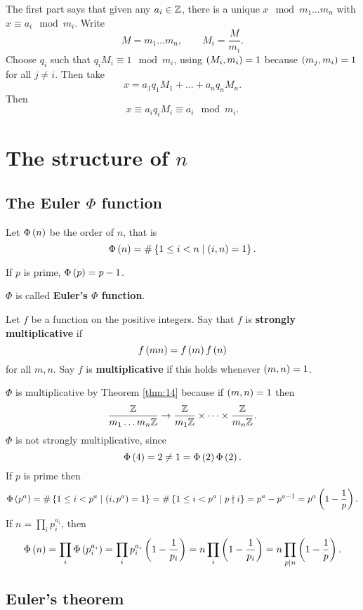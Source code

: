 The first part says that given any $ a_i \in \mathbb{Z} $, there is a unique $ x \mod m_1 \dots m_n $ with $ x \equiv a_i \mod m_i $. Write
$$ M = m_1 \dots m_n, \qquad M_i = \dfrac{M}{m_i}. $$
Choose $ q_i $ such that $ q_iM_i \equiv 1 \mod m_i $, using $ \left( M_i, m_i \right) = 1 $ because $ \left( m_j, m_i \right) = 1 $ for all $ j \ne i $. Then take
$$ x = a_1q_1M_1 + \dots + a_nq_nM_n. $$
Then
$$ x \equiv a_iq_iM_i \equiv a_i \mod m_i. $$

\pagebreak

\section{The structure of $ \unit{n} $}

\subsection{The Euler $ \Phi $ function}

Let $ \Phi\left( n \right) $ be the order of $ \unit{n} $, that is
$$ \Phi\left( n \right) = \#\left\{ 1 \le i < n \mid \left( i, n \right) = 1 \right\}. $$

\begin{example*}
If $ p $ is prime, $ \Phi\left( p \right) = p - 1 $.
\end{example*}

$ \Phi $ is called \textbf{Euler's $ \Phi $ function}.

\begin{definition}
Let $ f $ be a function on the positive integers. Say that $ f $ is \textbf{strongly multiplicative} if
$$ f\left( mn \right) = f\left( m \right)f\left( n \right) $$
for all $ m, n $. Say $ f $ is \textbf{multiplicative} if this holds whenever $ \left( m, n \right) = 1 $.
\end{definition}
  
$ \Phi $ is multiplicative by Theorem \ref{thm:14} because if $ \left( m, n \right) = 1 $ then
$$ \dfrac{\mathbb{Z}}{m_1 \dots m_n\mathbb{Z}} \to \dfrac{\mathbb{Z}}{m_1\mathbb{Z}} \times \dots \times \dfrac{\mathbb{Z}}{m_n\mathbb{Z}}. $$
$ \Phi $ is not strongly multiplicative, since
$$ \Phi\left( 4 \right) = 2 \ne 1 = \Phi\left( 2 \right)\Phi\left( 2 \right). $$
If $ p $ is prime then
$$ \Phi\left( p^a \right) = \#\left\{ 1 \le i < p^a \mid \left( i, p^a \right) = 1 \right\} = \#\left\{ 1 \le i < p^a \mid p \nmid i \right\} = p^a - p^{a - 1} = p^a\left( 1 - \dfrac{1}{p} \right). $$
If $ n = \prod_i p_i^{a_i} $, then
$$ \Phi\left( n \right) = \prod_i \Phi\left( p_i^{a_i} \right) = \prod_i p_i^{a_i}\left( 1 - \dfrac{1}{p_i} \right) = n\prod_i \left( 1 - \dfrac{1}{p_i} \right) = n\prod_{p \mid n} \left( 1 - \dfrac{1}{p} \right). $$

\subsection{Euler's theorem}

